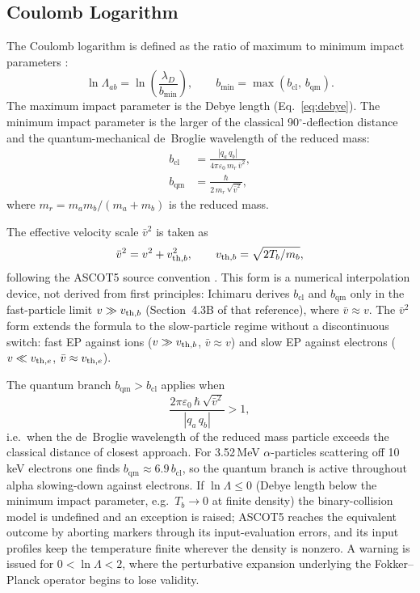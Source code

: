 \documentclass[11pt]{article}
\newcommand{\vth}[1][]{v_{\mathrm{th}\ifx&#1&\else,#1\fi}}
\newcommand{\lnL}{\ln\Lambda}
\newcommand{\lambdaD}{\lambda_D}
\newcommand{\eps}{\varepsilon_0}
\begin{document}
\subsection{Coulomb Logarithm}
\label{sec:clog}

The Coulomb logarithm is defined as the ratio of maximum to minimum impact parameters
\cite{spitzer1962,nrl,ichimaru1973}:
\begin{equation}
  \lnL_{ab} = \ln\!\left(\frac{\lambdaD}{b_{\min}}\right),
  \qquad b_{\min} = \max(b_{\mathrm{cl}},\, b_{\mathrm{qm}}).
  \label{eq:lnL}
\end{equation}
The maximum impact parameter is the Debye length (Eq.~\eqref{eq:debye}).
The minimum impact parameter is the larger of the classical 90$^\circ$-deflection
distance and the quantum-mechanical de~Broglie wavelength of the reduced mass:
\begin{align}
  b_{\mathrm{cl}} &= \frac{|q_a\,q_b|}{4\pi\eps\,m_r\,\bar{v}^2},
  \label{eq:bcl}
  \\[4pt]
  b_{\mathrm{qm}} &= \frac{\hbar}{2\,m_r\,\sqrt{\bar{v}^2}},
  \label{eq:bqm}
\end{align}
where $m_r = m_a m_b/(m_a + m_b)$ is the reduced mass.

The effective velocity scale $\bar{v}^2$ is taken as
\begin{equation}
  \bar{v}^2 = v^2 + \vth[b]^2, \qquad \vth[b] = \sqrt{2T_b/m_b},
  \label{eq:vbar}
\end{equation}
following the ASCOT5 source convention \cite{ascot5code}.
This form is a numerical interpolation device, not derived from first
principles: Ichimaru \cite{ichimaru1973} derives $b_{\mathrm{cl}}$ and
$b_{\mathrm{qm}}$ only in the fast-particle limit $v\gg\vth[b]$
(Section~4.3B of that reference), where $\bar{v}\approx v$.
The $\bar{v}^2$ form extends the formula to the slow-particle regime
without a discontinuous switch:
fast EP against ions ($v\gg\vth[b]$, $\bar{v}\approx v$) and
slow EP against electrons ($v\ll\vth[e]$, $\bar{v}\approx\vth[e]$).

The quantum branch $b_{\mathrm{qm}} > b_{\mathrm{cl}}$ applies when
\begin{equation}
  \frac{2\pi\eps\,\hbar\,\sqrt{\bar{v}^2}}{|q_a\,q_b|} > 1,
\end{equation}
i.e.\ when the de~Broglie wavelength of the reduced mass particle exceeds the
classical distance of closest approach.  For 3.52\,MeV $\alpha$-particles
scattering off 10\,keV electrons one finds $b_{\mathrm{qm}} \approx 6.9\,b_{\mathrm{cl}}$,
so the quantum branch is active throughout alpha slowing-down against electrons.
If $\lnL \leq 0$ (Debye length below the minimum impact parameter, e.g.\
$T_b \to 0$ at finite density) the binary-collision model is undefined and
an exception is raised; ASCOT5 reaches the equivalent outcome by aborting
markers through its input-evaluation errors, and its input profiles keep
the temperature finite wherever the density is nonzero.  A warning is
issued for $0 < \lnL < 2$, where the perturbative expansion underlying
the Fokker--Planck operator begins to lose validity.
\end{document}
